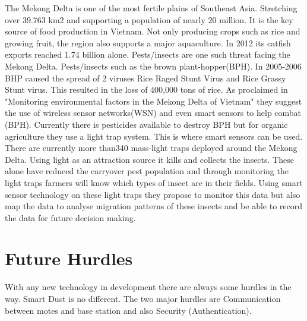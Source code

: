 \documentclass[article]{IEEEtran}
\begin{document}
The Mekong Delta is one of the most fertile plains of Southeast Asia. Stretching over 39.763 km2 and supporting a population of nearly 20 million. It is the key source of food production in Vietnam. Not only producing crops such as rice and growing fruit, the region also supports a major aquaculture. In 2012 its catfish exports reached 1.74 billion alone\cite{MekongDelta}.
Pests/insects are one such threat facing the Mekong Delta. Pests/insects such as the brown plant-hopper(BPH). In 2005-2006 BHP caused the spread of 2 viruses Rice Raged Stunt Virus and Rice Grassy Stunt virus. This resulted in the loss of 400,000 tons of rice. 
As proclaimed in "Monitoring environmental factors in the Mekong Delta of Vietnam"\cite{MekongDelta} they suggest the use of wireless sensor networks(WSN) and even smart sensors to help combat (BPH). Currently there is pesticides available to destroy BPH but for organic agriculture they use a light trap system. This is where smart sensors can be used.  There are currently more than340 mass-light traps deployed around the Mekong Delta. Using light as an attraction source it kills and collects the insects. These alone have reduced the carryover pest population and through monitoring the light traps farmers will know which types of insect are in their fields. Using smart sensor technology on these light traps they propose to monitor this data but also map the data to analyse migration patterns of these insects and be able to record the data for future decision making\cite{MekongDelta}.

\section{Future Hurdles}

With any new technology in development there are always some hurdles in the way. Smart Dust is no different. The two major hurdles are Communication between motes and base station and also Security (Authentication). 
\end{document}
